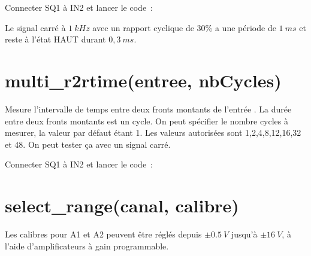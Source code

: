 \documentclass[a4paper,12pt,french]{sphinxmanual}
\begin{document}
Connecter SQ1 à IN2 et lancer le code :

\begin{sphinxVerbatim}[commandchars=\\\{\}]
 
  
\end{sphinxVerbatim}


Le signal carré à \(1~kHz\) avec un rapport cyclique de 30\% a une
période de \(1~ms\) et reste à l’état HAUT durant \(0,3~ms\).


\section{multi\_r2rtime(entree, nbCycles)}
\label{\detokenize{7.1:multi-r2rtime-entree-nbcycles}}
Mesure l’intervalle de temps entre deux fronts montants de l’entrée
. La durée entre deux fronts montants est un cycle.
On peut spécifier le nombre cycles à mesurer, la valeur par défaut
étant 1. Les valeurs autorisées sont 1,2,4,8,12,16,32 et 48. On peut
tester ça avec un signal carré.

Connecter SQ1 à IN2 et lancer le code :

\begin{sphinxVerbatim}[commandchars=\\\{\}]
  
\end{sphinxVerbatim}



\section{select\_range(canal, calibre)}
\label{\detokenize{7.1:select-range-canal-calibre}}
Les calibres pour A1 et A2 peuvent être réglés depuis \(\pm0.5~V\)
jusqu’à \(\pm16~V\), à l’aide d’amplificateurs à gain programmable.

\begin{sphinxVerbatim}[commandchars=\\\{\}]
          
          
\end{sphinxVerbatim}
\end{document}
